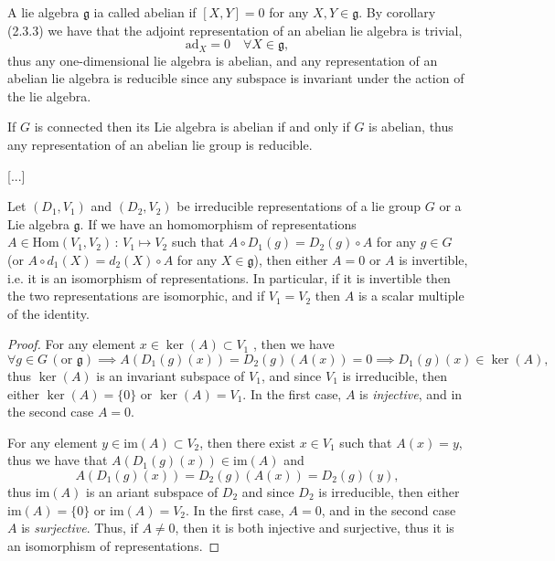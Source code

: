 \begin{definition}
    A lie algebra \(\mathfrak{g}\) ia called abelian if \([X, Y] = 0\) for any \(X, Y \in \mathfrak{g}\). By corollary (2.3.3) we have that the adjoint representation of an abelian lie algebra is trivial,
    \[
        \mathrm{ad}_X = 0 \quad \forall X \in \mathfrak{g},
    \]
    thus any one-dimensional lie algebra is abelian, and any representation of an abelian lie algebra is reducible since any subspace is invariant under the action of the lie algebra. 
\end{definition}

If \(G\) is connected then its Lie algebra is abelian if and only if \(G\) is abelian, thus any representation of an abelian lie group is reducible.

    [...]

\begin{theorem}
    Let \((D_1, V_1)\) and \((D_{2}, V_2 )\) be irreducible representations of a lie group \(G\) or a Lie algebra \(\mathfrak{g}\). If we have an homomorphism of representations \(A \in \text{Hom}(V_1, V_2) \,:\, V_1 \mapsto V_2\) such that \(A \circ D_1(g) = D_2(g) \circ A\) for any \(g \in G\) (or \(A \circ d_1(X) = d_2(X) \circ A\) for any \(X \in \mathfrak{g}\)), then either \(A = 0\) or \(A\) is invertible, i.e. it is an isomorphism of representations. In particular, if it is invertible then the two representations are isomorphic, and if \(V_1 = V_2\) then \(A\) is a scalar multiple of the identity.
\end{theorem}
\begin{proof}
    For any element \(x \in \ker(A) \subset V_1\) , then we have
    \[
        \forall g \in G \, ( \text{or } \mathfrak{g}) \implies A(D_1(g)(x)) = D_2(g)(A(x)) = 0 \implies D_1(g)(x) \in \ker(A),
    \]
    thus \(\ker(A)\) is an invariant subspace of \(V_1\), and since \(V_1\) is irreducible, then either \(\ker(A) = \{0\}\) or \(\ker(A) = V_1\). In the first case, \(A\) is \textit{injective}, and in the second case \(A = 0\).

    For any element \(y \in \text{im}(A) \subset V_2\), then there exist \(x \in V_1\) such that \(A(x) = y\), thus we have that \(A(D_1(g)(x)) \in \text{im}(A)\) and
    \[
        A(D_1(g)(x)) = D_2(g)(A(x)) = D_2(g)(y),
    \]
    thus \(\text{im}(A)\) is an ariant subspace of \(D_2\) and since \(D_2\) is irreducible, then either \(\text{im}(A) = \{0\}\) or \(\text{im}(A) = V_2\). In the first case, \(A = 0\), and in the second case \(A\) is \textit{surjective}. Thus, if \(A \neq 0\), then it is both injective and surjective, thus it is an isomorphism of representations.
\end{proof}







